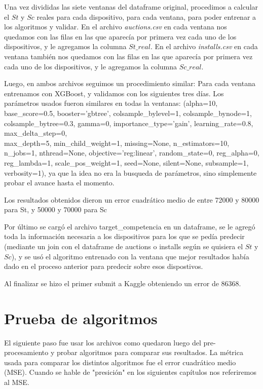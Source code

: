 \documentclass{article}
\begin{document}
Una vez divididas las siete ventanas del dataframe original, procedimos a calcular el $St$ y $Sc$ reales para cada dispositivo, para cada ventana, para poder entrenar a los algoritmos y validar. 
En el archivo \textit{auctions.csv} en cada ventana nos quedamos con las filas en las que aparecía por primera vez cada uno de los dispositivos, y le agregamos la columna $St\_real$.
En el archivo \textit{installs.csv} en cada ventana también nos quedamos con las filas en las que aparecía por primera vez cada uno de los dispositivos, y le agregamos la columna $Sc\_real$.

Luego, en ambos archivos seguimos un procedimiento similar: Para cada ventana entrenamos con XGBoost, y validamos con los siguientes tres días. Los parámetros usados fueron similares en todas la ventanas: 
(alpha=10, base\_score=0.5, booster='gbtree', colsample\_bylevel=1, colsample\_bynode=1, colsample\_bytree=0.3, gamma=0, importance\_type='gain', learning\_rate=0.8, max\_delta\_step=0, \\max\_depth=5, min\_child\_weight=1, missing=None, n\_estimators=10, n\_jobs=1, nthread=None, objective='reg:linear', random\_state=0, reg\_alpha=0, reg\_lambda=1, scale\_pos\_weight=1, seed=None, silent=None, subsample=1, verbosity=1), ya que la idea no era la busqueda de parámetros, sino simplemente probar el avance hasta el momento.

Los resultados obtenidos dieron un error cuadrático medio de entre 72000 y 80000 para St, y 50000 y 70000 para Sc

Por último se cargó el archivo target\_competencia en un dataframe, se le agregó toda la información necesaria a los dispositivos para los que se pedía predecir (mediante un join con el dataframe de auctions o installs según se quisiera el $St$ y $Sc$), y se usó el algoritmo entrenado con la ventana que mejor resultados había dado en el proceso anterior para predecir sobre esos dispostivos.

Al finalizar se hizo el primer submit a Kaggle obteniendo un error de 86368.

\newpage
\section{Prueba de algoritmos}
El siguiente paso fue usar los archivos como quedaron luego del pre-procesamiento y probar algoritmos para comparar sus resultados. La métrica usada para comparar los distintos algoritmos fue el error cuadrático medio (MSE). Cuando se hable de "presición" en los siguientes capítulos nos referiremos al MSE.
\end{document}
